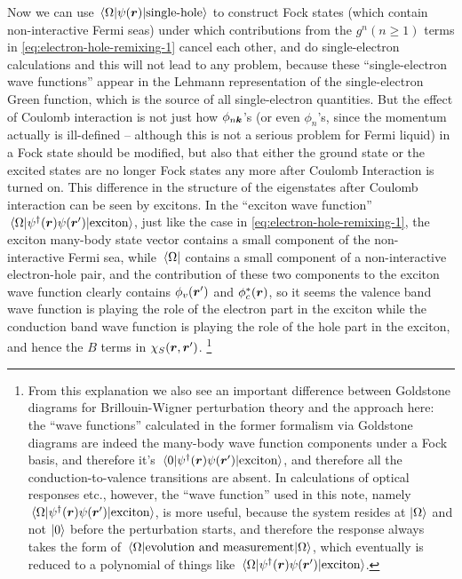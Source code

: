 \documentclass[hyperref, a4paper, 12pt]{report}
\begin{document}
Now we can use $\mel{\Omega}{\psi(\vb*{r})}{\text{single-hole}}$ 
to construct Fock states (which contain non-interactive Fermi seas)
under which contributions from the $g^n (n \geq 1)$ terms in \eqref{eq:electron-hole-remixing-1} cancel each other,
and do single-electron calculations and this will not lead to any problem,
because these ``single-electron wave functions''
appear in the Lehmann representation of the single-electron Green function,
which is the source of all single-electron quantities.
But the effect of Coulomb interaction is not just how $\phi_{n \vb*{k}}$'s
(or even $\phi_{n}$'s, since the momentum actually is ill-defined
-- although this is not a serious problem for Fermi liquid)
in a Fock state should be modified, 
but also that either the ground state or the excited states 
are no longer Fock states any more 
after Coulomb Interaction is turned on. 
This difference in the structure of the eigenstates after Coulomb interaction can be seen by excitons.
In the ``exciton wave function'' $\mel{\Omega}{\psi^\dagger(\vb*{r}) \psi(\vb*{r}')}{\text{exciton}}$,
just like the case in \eqref{eq:electron-hole-remixing-1},
the exciton many-body state vector contains a small component of the non-interactive Fermi sea,
while $\bra*{\Omega}$ contains a small component of a non-interactive electron-hole pair,
and the contribution of these two components to the exciton wave function
clearly contains $\phi_v(\vb*{r}')$ and $\phi_c^*(\vb*{r})$,
so it seems the valence band wave function is playing the role of the electron part in the exciton
while the conduction band wave function is playing the role of the hole part in the exciton,
and hence the $B$ terms in $\chi_S(\vb*{r}, \vb*{r}')$.%
\footnote{
    From this explanation we also see an important difference between Goldstone diagrams for Brillouin-Wigner perturbation theory and the approach here:
    the ``wave functions'' calculated in the former formalism via Goldstone diagrams
    are indeed the many-body wave function components under a Fock basis,
    and therefore it's $\mel{0}{\psi^\dagger(\vb*{r}) \psi(\vb*{r}')}{\text{exciton}}$,
    and therefore all the conduction-to-valence transitions are absent.
    In calculations of optical responses etc., however, the ``wave function'' used in this note,
    namely $\mel{\Omega}{\psi^\dagger(\vb*{r}) \psi(\vb*{r}')}{\text{exciton}}$, is more useful,
    because the system resides at $\ket{\Omega}$ and not $\ket{0}$ before the perturbation starts,
    and therefore the response always takes the form of $\mel{\Omega}{\text{evolution and measurement}}{\Omega}$,
    which eventually is reduced to a polynomial of things like $\mel{\Omega}{\psi^\dagger(\vb*{r}) \psi(\vb*{r}')}{\text{exciton}}$.
}
\end{document}
